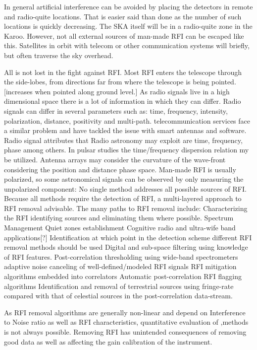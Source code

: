 In general artificial interference can be avoided by placing the detectors in remote and radio-quite locations.
That is easier said than done as the number of such locations is quickly decreasing.
The SKA itself will be in a radio-quite zone in the Karoo.
However, not all external sources of man-made RFI can be escaped like this.
Satellites in orbit with telecom or other communication systems will briefly, but often traverse the sky overhead.

All is not lost in the fight against RFI.
Most RFI enters the telescope through the side-lobes, from directions far from where the telescope is being pointed.\citep{van2009radio}
[increases when pointed along ground level.]
As radio signals live in a high dimensional space there is a lot of information in which they can differ.
Radio signals can differ in several parameters such as: time, frequency, intensity, polarization, distance, positivity and multi-path.
telecommunication services face a similar problem and have tackled the issue with smart antennas and software.
Radio signal attributes that Radio astronomy may exploit are time, frequency, phase among others.
In pulsar studies the time/frequency dispersion relation my be utilized.
Antenna arrays may consider the curvature of the wave-front considering the position and distance phase space.
Man-made RFI is usually polarized, so some astronomical signals can be observed by only measuring the unpolarized component:
\be
{}
\ee
No single method addresses all possible sources of RFI\citep{fridman2001rfi}.
Because all methods require the detection of RFI, a multi-layered approach to RFI removal advisable\citep{fridman2001rfi}.
The many paths to RFI removal include\citep{fridman2001rfi}:
Characterizing the RFI identifying sources and eliminating them where possible.
Spectrum Management
Quiet zones establishment
Cognitive radio and ultra-wife band applications[?]
Identification at which point in the detection scheme different RFI removal methods should be used
Digital and sub-space filtering using knowledge of RFI features.
Post-correlation thresholding using wide-band spectrometers
adaptive noise canceling of well-defined/modeled RFI signals
RFI mitigation algorithms embedded into correlators
Automatic post-correlation RFI flagging algorithms
Identification and removal of terrestrial sources using fringe-rate compared with that of celestial sources in the post-correlation data-stream. 

As RFI removal algorithms are generally non-linear and depend on Interference to Noise ratio as well as RFI characteristics, quantitative evaluation of ,methods is not always possible.
Removing RFI has unintended consequences of removing  good data as well as affecting the gain calibration of the instrument\citep{fridman2001rfi}.



